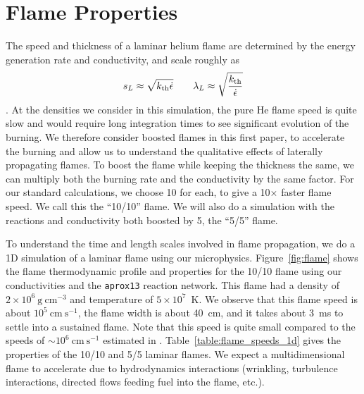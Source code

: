 \documentclass[trackchanges,preprint,times,tighten]{aastex63}
\newcommand{\epsdot}{\dot{\epsilon}}
\newcommand{\kth}{k_{\rm th}}
\newcommand{\gcc}{\mathrm{g~cm^{-3} }}
\newcommand{\cms}{\mathrm{cm~s^{-1} }}
\newcommand{\AssignTo}[1]{
    \marginpar{\vskip-\baselineskip%
               \raggedright%
               \tiny\sffamily%
               {\color{blue}\hrule%
               \smallskip%
               #1\par%
               \smallskip%
               \hrule}}%
}
\begin{document}
\section{Flame Properties}\label{Sec:Flame}

The speed and thickness of a laminar helium flame are determined by the
energy generation rate and conductivity, and scale roughly as
\begin{equation}
\label{eq:flame_scaling}
s_L \approx \sqrt{\kth \epsdot} \qquad
\lambda_L \approx \sqrt{\frac{\kth}{\epsdot}}
\end{equation}
\citep{orourke:1979,khokhlov:1993}.
At the densities we consider in this simulation, the pure He flame
speed is quite slow and would require long integration
times to see significant evolution of the burning.  We therefore
consider boosted flames in this first paper, to accelerate the burning
and allow us to understand the qualitative effects of laterally
propagating flames.  To boost the flame while keeping the thickness
the same, we can multiply both the burning rate and the conductivity
by the same factor.  For our standard calculations, we choose 10 for
each, to give a 10$\times$ faster flame speed.  We call this the ``10/10''
flame.  We will also do a simulation with the reactions and
conductivity both boosted by 5, the ``5/5'' flame.

To understand the time and length scales involved in flame
propagation, we do a 1D simulation of a laminar flame using our
microphysics.  Figure~\ref{fig:flame} shows the flame thermodynamic
profile and properties for the 10/10 flame using
our conductivities and the {\tt aprox13} reaction network.  This flame
had a density of $2\times 10^6~\gcc$ and
temperature of $5\times 10^7$~K.  We observe that this flame speed is
about $10^5~\cms$, the flame width is about 40~cm, and it
takes about 3~ms to settle into a sustained flame.  Note that this speed
is quite small compared to the speeds of $\sim 10^6~\cms$ estimated in
\citet{spitkovsky2002}.  Table~\ref{table:flame_speeds_1d} gives the properties
of the 10/10 and 5/5 laminar flames.  We expect a multidimensional flame to
accelerate due to hydrodynamics interactions (wrinkling, turbulence
interactions, directed flows feeding fuel into the flame, etc.).


\begin{figure*}[t]
\caption{\label{fig:flame} Time-evolution of the 10$\times$ boosted 1D
	laminar flame. The left plot shows temperature and nuclear energy
	generation profiles at 11 different times, while the right plot
	shows flame propagation speed and flame thickness as functions of time.}
\end{figure*}
\end{document}

